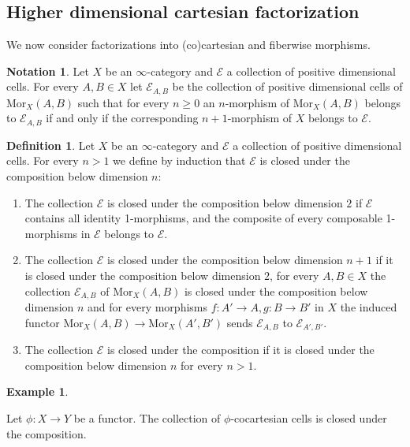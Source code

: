 \documentclass[10pt,oneside]{article}
\numberwithin{equation}{section} %
\numberwithin{figure}{section} %
\theoremstyle{plain}
\theoremstyle{definition}
\newtheorem{definition}[theorem]{Definition}
\newtheorem{notation}[theorem]{Notation}
\newtheorem{example}[theorem]{Example}
\newcommand{\mE}{{\mathcal E}}
\newcommand{\Mor}{{\mathrm{Mor}}}
\begin{document}
\subsection{Higher dimensional cartesian factorization}

We now consider factorizations into (co)cartesian and fiberwise morphisms.


\begin{notation}Let $X$ be an $\infty$-category and $\mE$ a collection of positive dimensional cells.
For every $A,B \in X$ let $\mE_{A,B} $ be the collection of positive dimensional cells of $\Mor_X(A,B)$ such that for every $n \geq 0$ an $n$-morphism of 
$\Mor_X(A,B)$ belongs to $\mE_{A,B} $ if and only if the corresponding $n+1$-morphism of $X$ belongs to $\mE.$
\end{notation}



\begin{definition}
Let $X$ be an $\infty$-category and $\mE$ a collection of positive dimensional cells. For every $n > 1$ we define by induction that $\mE$ is closed under the composition below dimension $n$:

\begin{enumerate}[\normalfont(1)]\setlength{\itemsep}{-2pt}
\item The collection $\mE$ is closed under the composition below dimension $2$ if $\mE$ contains all identity 1-morphisms, and 
the composite of every composable 1-morphisms in $\mE$ belongs to $\mE$.

\item The collection $\mE$ is closed under the composition below dimension $n+1$ if it is closed under the composition below dimension $2$, for every $A,B \in X$ the collection
$\mE_{A,B} $ of $\Mor_X(A,B) $ is closed under the composition below dimension $n $ and for every morphisms $f: A' \to A, g: B \to B' $ in $X$ the induced functor $\Mor_X(A,B) \to \Mor_X(A',B') $ sends $\mE_{A,B}$ to $\mE_{A',B'}$.

\item The collection $\mE$ is closed under the composition if it is closed under the composition below dimension $n $ for every $n > 1.$

\end{enumerate}

\end{definition}

\begin{example}\label{cocartex}

Let $\phi: X \to Y$ be a functor.
The collection of $\phi$-cocartesian cells is closed under the composition.
    
\end{example}
\end{document}
